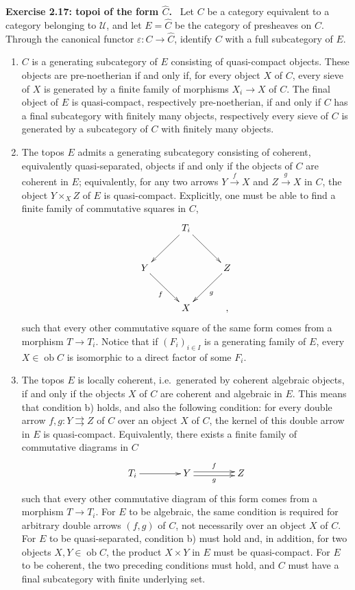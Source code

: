 \documentclass[11pt]{article}
\newcommand{\U}{\mathcal{U}}
\newcommand{\ob}{\operatorname{ob}}
\newcommand{\ie}{i.e.\ }
\newenvironment{remarktext}[1]{\par\medskip\noindent\textbf{#1.}\ }{\par\medskip}
\begin{document}
\begin{remarktext}{Exercise 2.17: topoi of the form \(\widehat C\)}
Let \(C\) be a category equivalent to a category belonging to \(\U\), and let \(E=\widehat C\) be the category of presheaves on \(C\). Through the canonical functor \(\varepsilon:C\to\widehat C\), identify \(C\) with a full subcategory of \(E\).
\begin{enumerate}[label=\alph*)]
\item \(C\) is a generating subcategory of \(E\) consisting of quasi-compact objects. These objects are pre-noetherian if and only if, for every object \(X\) of \(C\), every sieve of \(X\) is generated by a finite family of morphisms \(X_i\to X\) of \(C\). The final object of \(E\) is quasi-compact, respectively pre-noetherian, if and only if \(C\) has a final subcategory with finitely many objects, respectively every sieve of \(C\) is generated by a subcategory of \(C\) with finitely many objects.
\item The topos \(E\) admits a generating subcategory consisting of coherent, equivalently quasi-separated, objects if and only if the objects of \(C\) are coherent in \(E\); equivalently, for any two arrows \(Y\xrightarrow f X\) and \(Z\xrightarrow g X\) in \(C\), the object \(Y\times_XZ\) of \(E\) is quasi-compact. Explicitly, one must be able to find a finite family of commutative squares in \(C\),
\[
\xymatrix@=1cm{
 & T_i\ar[ld]\ar[rd]&\\
Y\ar[rd]_f&&Z\ar[ld]^g\\
&X&,
}
\]
such that every other commutative square of the same form comes from a morphism \(T\to T_i\). Notice that if \((F_i)_{i\in I}\) is a generating family of \(E\), every \(X\in\ob C\) is isomorphic to a direct factor of some \(F_i\).
\item The topos \(E\) is locally coherent, \ie generated by coherent algebraic objects, if and only if the objects \(X\) of \(C\) are coherent and algebraic in \(E\). This means that condition b) holds, and also the following condition: for every double arrow \(f,g:Y\rightrightarrows Z\) of \(C\) over an object \(X\) of \(C\), the kernel of this double arrow in \(E\) is quasi-compact. Equivalently, there exists a finite family of commutative diagrams in \(C\)
\[
\xymatrix@C=1.5cm{T_i\ar[r]&Y\ar@<2pt>[r]^f\ar@<-2pt>[r]_g&Z}
\]
such that every other commutative diagram of this form comes from a morphism \(T\to T_i\). For \(E\) to be algebraic, the same condition is required for arbitrary double arrows \((f,g)\) of \(C\), not necessarily over an object \(X\) of \(C\). For \(E\) to be quasi-separated, condition b) must hold and, in addition, for two objects \(X,Y\in\ob C\), the product \(X\times Y\) in \(E\) must be quasi-compact. For \(E\) to be coherent, the two preceding conditions must hold, and \(C\) must have a final subcategory with finite underlying set.

\end{enumerate}
\end{remarktext}
\end{document}

